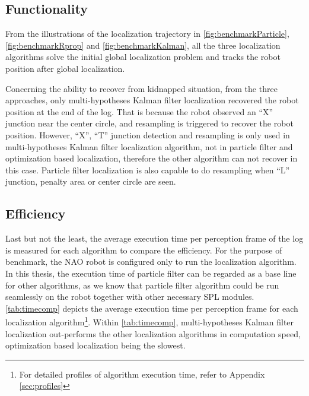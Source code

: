 \subsection{Functionality}
\label{sub:Functionality}

From the illustrations of the localization trajectory in \autoref{fig:benchmarkParticle}, \autoref{fig:benchmarkRprop} and \autoref{fig:benchmarkKalman}, all the three localization algorithms solve the initial global localization problem and tracks the robot position after global localization. 

Concerning the ability to recover from kidnapped situation, from the three approaches, only multi-hypotheses Kalman filter localization recovered the robot position at the end of the log. That is because the robot observed an ``X'' junction near the center circle, and resampling is triggered to recover the robot position. However, ``X'', ``T'' junction detection and resampling is only used in multi-hypotheses Kalman filter localization algorithm, not in particle filter and optimization based localization, therefore the other algorithm can not recover in this case. Particle filter localization is also capable to do resampling when ``L'' junction, penalty area or center circle are seen.

\subsection{Efficiency}
\label{sub:Efficiency}
Last but not the least, the average execution time per perception frame of the log is measured for each algorithm to compare the efficiency. For the purpose of benchmark, the NAO robot is configured only to run the localization algorithm. In this thesis, the execution time of particle filter can be regarded as a base line for other algorithms, as we know that particle filter algorithm could be run seamlessly on the robot together with other necessary \gls{SPL} modules. \autoref{tab:timecomp} depicts the average execution time per perception frame for each localization algorithm\footnote{For detailed profiles of algorithm execution time, refer to Appendix \ref{sec:profiles}}. Within \autoref{tab:timecomp}, multi-hypotheses Kalman filter localization out-performs the other localization algorithms in computation speed, optimization based localization being the slowest.




